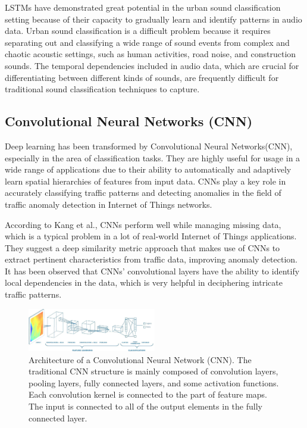 \documentclass[conference]{IEEEtran}
\begin{document}
LSTMs have demonstrated great potential in the urban sound classification setting because of their capacity to gradually learn and identify patterns in audio data.\cite{lezhenin2019urban} Urban sound classification is a difficult problem because it requires separating out and classifying a wide range of sound events from complex and chaotic acoustic settings, such as human activities, road noise, and construction sounds. The temporal dependencies included in audio data, which are crucial for differentiating between different kinds of sounds, are frequently difficult for traditional sound classification techniques to capture.

\subsection{Convolutional Neural Networks (CNN)}
Deep learning has been transformed by Convolutional Neural Networks(CNN), especially in the area of classification tasks. They are highly useful for usage in a wide range of applications due to their ability to automatically and adaptively learn spatial hierarchies of features from input data.\cite{lu2021review} CNNs play a key role in accurately classifying traffic patterns and detecting anomalies in the field of traffic anomaly detection in Internet of Things networks.

According to Kang et al., CNNs perform well while managing missing data, which is a typical problem in a lot of real-world Internet of Things applications. They suggest a deep similarity metric approach that makes use of CNNs to extract pertinent characteristics from traffic data, improving anomaly detection. It has been observed that CNNs' convolutional layers have the ability to identify local dependencies in the data, which is very helpful in deciphering intricate traffic patterns.\cite{CNN}


\begin{figure}[htbp]
\centering
\includegraphics[width=0.5\textwidth]{Images/cnn.jpg}
\caption{Architecture of a Convolutional Neural Network (CNN). The traditional CNN structure is mainly composed of convolution layers, pooling layers, fully connected layers, and some activation functions. Each convolution kernel is connected to the part of feature maps. The input is connected to all of the output elements in the fully connected layer. \cite{CNN}}
\label{fig:CNN}
\end{figure}
\end{document}
